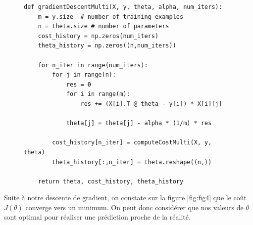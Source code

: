\begin{figure}[!h]
\begin{verbatim}
def gradientDescentMulti(X, y, theta, alpha, num_iters):  
    m = y.size  # number of training examples
    n = theta.size # number of parameters
    cost_history = np.zeros(num_iters)
    theta_history = np.zeros((n,num_iters))

    for n_iter in range(num_iters):
        for j in range(n):
            res = 0
            for i in range(m):
                res += (X[i].T @ theta - y[i]) * X[i][j]
            
            theta[j] = theta[j] - alpha * (1/m) * res

        cost_history[n_iter] = computeCostMulti(X, y, theta)
        theta_history[:,n_iter] = theta.reshape((n,))
              
    return theta, cost_history, theta_history
\end{verbatim}   
\label{listing:gradientDescentMulti}
\end{figure}


Suite à notre descente de gradient, on constate sur la figure \ref{fig:fig4} que le coût $J(\theta)$ converge vers un minimum. On peut donc considérer que nos valeurs de $\theta$ sont optimal pour réaliser une prédiction proche de la réalité.

